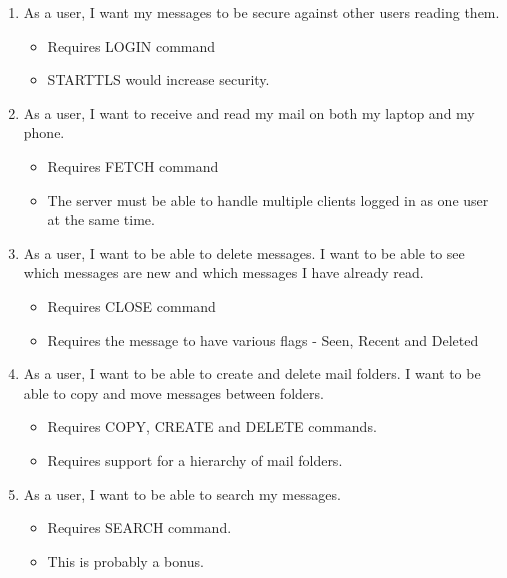 \documentclass[a4paper,12pt]{article}
\begin{document}
\begin{enumerate}

\item As a user, I want my messages to be secure against other users reading them.

  \begin{itemize}
  \item Requires LOGIN command
  \item STARTTLS would increase security.
  \end{itemize}

\item As a user, I want to receive and read my mail on both my laptop and my phone.

  \begin{itemize}
  \item Requires FETCH command
  \item The server must be able to handle multiple clients logged in as one user at the same time.
  \end{itemize}

\item As a user, I want to be able to delete messages. I want to be able to see which messages are new and which messages I have already read.

  \begin{itemize}
  \item Requires CLOSE command
  \item Requires the message to have various flags - Seen, Recent and Deleted
  \end{itemize}

\item As a user, I want to be able to create and delete mail folders. I want to be able to copy and move messages between folders.

  \begin{itemize}
  \item Requires COPY, CREATE and DELETE commands.
  \item Requires support for a hierarchy of mail folders.
  \end{itemize}

\item As a user, I want to be able to search my messages.

  \begin{itemize}
  \item Requires SEARCH command.
  \item This is probably a bonus.
  \end{itemize}

\end{enumerate}
\end{document}
